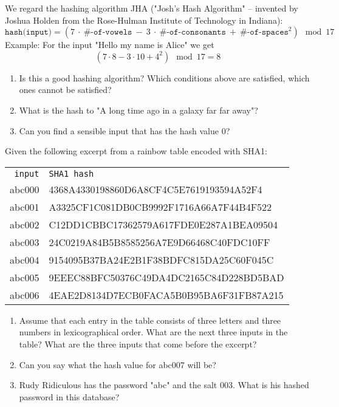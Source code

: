 \documentclass[11pt,a4paper]{report}
\begin{document}
\begin{ex}
We regard the hashing algorithm JHA ("Josh's Hash Algorithm" -- invented by Joshua Holden from the Rose-Hulman Institute of Technology in Indiana): 
\[
\texttt{hash(input)} = (7\ \cdot\ \texttt{\#-of-vowels}\  -\  3\ \cdot \ \texttt{\#-of-consonants}\  +\  \texttt{\#-of-spaces}^2) \mod 17
\]
Example: For the input "Hello my name is Alice" we get
\[
(7\cdot 8 - 3\cdot 10 + 4^2) \mod 17 = 8
\] 
\begin{enumerate}
\item Is this a good hashing algorithm? Which conditions above are satisfied, which ones cannot be satisfied?
\item What is the hash to "A long time ago in a galaxy far far away"?
\item Can you find a sensible input that has the hash value $0$?
\end{enumerate}
\end{ex}


\begin{ex}
Given the following excerpt from a rainbow table encoded with  SHA1:

\begin{tabular}{rl}
\texttt{input} & \texttt{SHA1 hash} \\
abc000 & 4368A4330198860D6A8CF4C5E7619193594A52F4 \\
abc001 & A3325CF1C081DB0CB9992F1716A66A7F44B4F522 \\
abc002 & C12DD1CBBC17362579A617FDE0E287A1BEA09504 \\
abc003 & 24C0219A84B5B8585256A7E9D66468C40FDC10FF \\ 
abc004 & 9154095B37BA24E2B1F38BDFC815DA25C60F045C \\
abc005 & 9EEEC88BFC50376C49DA4DC2165C84D228BD5BAD \\
abc006 & 4EAE2D8134D7ECB0FACA5B0B95BA6F31FB87A215 
\end{tabular}

\begin{enumerate}
\item Assume that each entry in the table consists of three letters and three numbers in lexicographical order. What are the next three inputs in the table? What are the three inputs that come before the excerpt?
\item Can you say what the hash value for abc007 will be?
\item Rudy Ridiculous has the password "abc" and the salt $003$. What is his hashed password in this database?
\end{enumerate}
\end{ex}
\end{document}
